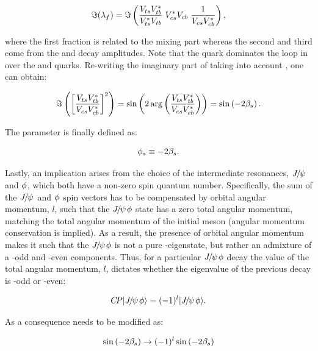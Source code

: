 \begin{equation}
  \centering
 \Im(\lambda_f) = \Im\parenthesis{ \frac{\Vts\Vtb^*}{\Vts^*\Vtb} \; \Vcs^*\Vcb \; \frac{1}{\Vcs\Vcb^*} },
 \label{lambdaf_ckm}
\end{equation}

\noindent where the first fraction is related to the mixing part \qoverp whereas the second and third come from
the \Bsb and \Bs decay amplitudes. Note that the \tquark quark dominates the loop in  over the
\cquark and \uquark quarks. Re-writing the imaginary part of  taking into account
, one can obtain:

\begin{equation}
  \centering
  \Im\parenthesis{ \brackets{ \frac{\Vts\Vtb^*}{\Vcs\Vcb^*}}^2 } =
  \sin \parenthesis{2 \arg \parenthesis{\frac{\Vts\Vtb^*}{\Vcs\Vcb^*}}} =
  \sin \parenthesis{-2\betas}.
 \label{lambda_ckm_manip}
\end{equation}

\noindent The parameter \phis is finally defined as:

\begin{equation}
  \centering
  \phis\equiv-2\betas.
 \label{phis_def}
\end{equation}

\noindent Lastly, an implication arises from the choice of the intermediate resonances, ${J\mskip -3mu/\mskip -2mu\psi\mskip 2mu}$ and $\phi$,
which both have a non-zero spin quantum number. Specifically, the sum of the ${J\mskip -3mu/\mskip -2mu\psi\mskip 2mu}$ and $\phi$ spin vectors
has to be compensated by orbital angular momentum, $l$, such that the ${J\mskip -3mu/\mskip -2mu\psi\mskip 2mu}\phi$ state has a zero total
angular momentum, matching the total angular momentum of the initial \Bs meson (angular momentum conservation is implied).
As a result, the presence of orbital angular momentum makes it such that the ${J\mskip -3mu/\mskip -2mu\psi\mskip 2mu}\phi$ is not a pure \CP-eigenstate,
but rather an admixture of a \CP-odd and \CP-even components. Thus, for a particular ${J\mskip -3mu/\mskip -2mu\psi\mskip 2mu}\phi$ decay the value of
the total angular momentum, $l$, dictates whether the \CP eigenvalue of the previous decay is \CP-odd or \CP-even:

\begin{equation}
  \centering
  \CP\ket{\jpsi\Pphi} = (-1)^l\ket{\jpsi\Pphi}.
 \label{cp_eigenstates}
\end{equation}

\noindent As a consequence  needs to be modified as:

\begin{equation}
  \centering
  \sin \parenthesis{-2\betas} \to (-1)^l \sin \parenthesis{-2\betas}
 \label{phis_def}
\end{equation}

